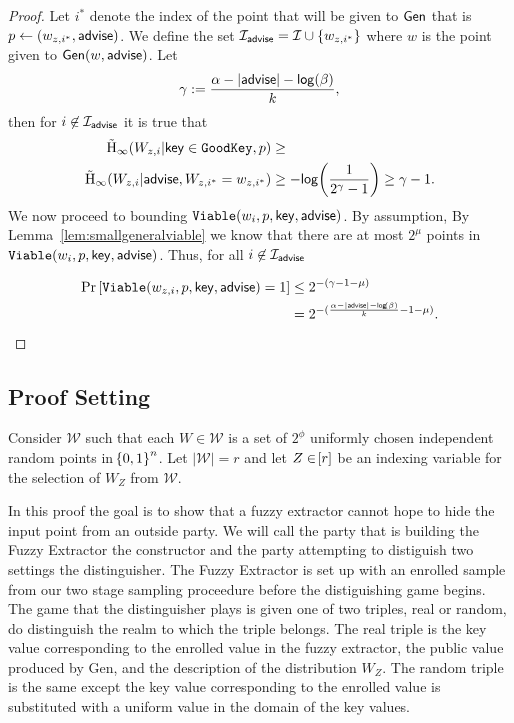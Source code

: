 \begin{proof}
Let $i^*$ denote the index of the point that will be given to ${\mathsf{Gen}}$ that is $p\leftarrow (w_{z,i^*}, {\mathsf{advise}})$.  We define the set $\mathcal{I}_{\mathsf{advise}} = \mathcal{I} \cup \{w_{z,i^*}\}$ where $w$ is the point given to ${\mathsf{Gen}}(w, {\mathsf{advise}})$.  
Let \[\gamma:=\frac{\alpha -|{\mathsf{advise}}| - \mathsf{log}\!\left(\beta\right)}{k},\] 
then for $i\not\in \mathcal{I}_{{\mathsf{advise}}}$ it is true that 
\begin{align*}
\tilde{\mathrm{H}}_\infty(W_{z,i} | \mathsf{key} \in \mathtt{GoodKey}, p)&\ge \\
\tilde{\mathrm{H}}_\infty(W_{z,i} | {\mathsf{advise}}, W_{z,i^*}= w_{z,i^*}) &\ge -\mathsf{log}\!\left(\frac{1}{2^{\gamma}-1}\right) \ge \gamma-1.
\end{align*}
We now proceed to bounding $\mathtt{Viable}(w_i, p, \mathsf{key}, {\mathsf{advise}})$.  By assumption, By Lemma~\ref{lem:smallgeneralviable} we know that there are at most $2^\mu$ points in $\mathtt{Viable}(w_i, p, \mathsf{key}, {\mathsf{advise}})$.  Thus, for all $i\not \in\mathcal{I}_{{\mathsf{advise}}}$ 

\begin{align*}
\Pr\left[\mathtt{Viable}(w_{z,i}, p, \mathsf{key}, {\mathsf{advise}}) = 1 \right]&\le 2^{- (\gamma-1 -\mu)}\\
&=2^{-(\frac{\alpha-|{\mathsf{advise}}|-\mathsf{log}\!\left(\beta\right)}{k}-1-\mu)}.
\end{align*}


\here
\end{proof}

\subsection{Proof Setting}
Consider $\mathcal{W}$ such that each $W \in \mathcal{W}$ is a set of $2^{\phi}$ uniformly chosen independent random points in $\!\left\{ 0,1 \right\}^{n}$. 
Let $|\mathcal{W}| = r$ and let $Z \in \!\left[r\right]$ be an indexing variable for the selection of $W_Z$ from $\mathcal{W}$. 

In this proof the goal is to show that a fuzzy extractor cannot hope to hide the input point from an outside party. 
We will call the party that is building the Fuzzy Extractor the constructor and the party attempting to distiguish two settings the distinguisher. 
The Fuzzy Extractor is set up with an enrolled sample from our two stage sampling proceedure before the distiguishing game begins.
The game that the distinguisher plays is given one of two triples, real or random, do distinguish the realm to which the triple belongs. 
The real triple is the key value corresponding to the enrolled value in the fuzzy extractor, the public value produced by Gen, and the description of the distribution $W_Z$.
The random triple is the same except the key value corresponding to the enrolled value is substituted with a uniform value in the domain of the key values.

